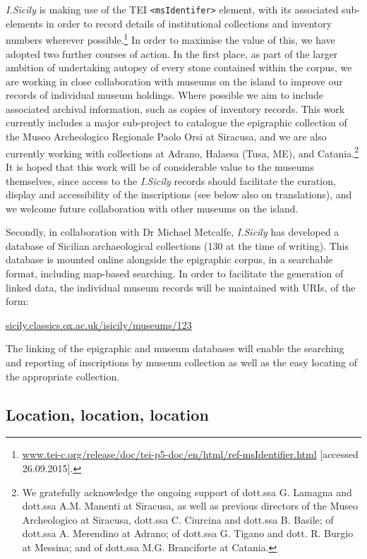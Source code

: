 \documentclass[amsthm,ebook]{saparticle}
\begin{document}
\emph{I.Sicily} is making use of the TEI \texttt{{\textless}msIdentifer{\textgreater}} element, with its associated sub-elements in
order to record details of institutional collections and inventory numbers wherever possible.\footnote{\url{www.tei-c.org/release/doc/tei-p5-doc/en/html/ref-msIdentifier.html} [accessed 26.09.2015].} In order to maximise the
value of this, we have adopted two further courses of action. In the first place, as part of the larger ambition of
undertaking autopsy of every stone contained within the corpus, we are working in close collaboration with museums on
the island to improve our records of individual museum holdings. Where possible we aim to include associated archival
information, such as copies of inventory records. This work currently includes a major sub-project to catalogue the
epigraphic collection of the Museo Archeologico Regionale Paolo Orsi at Siracusa, and we are also currently working
with collections at Adrano, Halaesa (Tusa, ME), and Catania.\footnote{ We gratefully acknowledge the ongoing support of
dott.ssa G. Lamagna and dott.ssa A.M. Manenti at Siracusa, as well as previous directors of the Museo Archeologico at
Siracusa, dott.ssa C. Ciurcina and dott.ssa B. Basile; of dott.ssa A. Merendino at Adrano; of dott.ssa G. Tigano and
dott. R. Burgio at Messina; and of dott.ssa M.G. Branciforte at Catania.} It is hoped that this work will be of
considerable value to the museums themselves, since access to the \emph{I.Sicily} records should facilitate the curation,
display and accessibility of the inscriptions (see below also on translations), and we welcome future collaboration
with other museums on the island.

Secondly, in collaboration with Dr Michael Metcalfe, \emph{I.Sicily} has developed a database of Sicilian archaeological
collections (130 at the time of writing). This database is mounted online alongside the epigraphic corpus, in a
searchable format, including map-based searching. In order to facilitate the generation of linked data, the individual
museum records will be maintained with URIs, of the form:

\url{sicily.classics.ox.ac.uk/isicily/museums/123}

The linking of the epigraphic and museum databases will enable the searching and reporting of inscriptions by museum
collection as well as the easy locating of the appropriate collection.




\subsection{Location, location, location}
\end{document}
